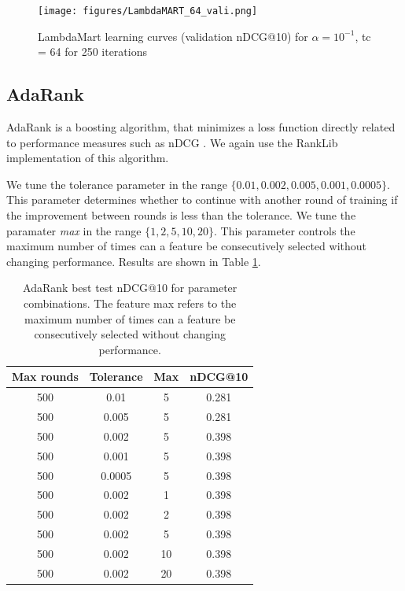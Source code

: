 \documentclass[english]{article}
\theoremstyle{definition}
\begin{document}
\begin{multicols}{2}
\begin{figure}[H]
\texttt{[image: figures/LambdaMART\_64\_vali.png]}
\caption{LambdaMart learning curves (validation nDCG@10) for $\alpha=10^{-1}$, tc = 64 for 250 iterations } \label{fig:LambdaMART_lc}
\label{LambdaMART_lc}
\end{figure}

\subsection{AdaRank}

AdaRank is a boosting algorithm, that minimizes a loss function directly related to performance measures such as nDCG \cite{Xu2007AdaRankAB}.  We again use the RankLib implementation of this algorithm.  

We tune the tolerance parameter in the range $\{0.01, 0.002, 0.005, 0.001, 0.0005\}$.  This parameter determines whether to continue with another round of training if the improvement between rounds is less than the tolerance.  We tune the paramater \emph{max} in the range $\{1, 2, 5, 10, 20\}$.  This parameter controls the maximum number of times can a feature be consecutively selected without changing performance.
Results are shown in Table \ref{tab:AdaRank_train}.

\begin{table}[H]
\begin{center}
\begin{tabular}{c c c c}
  \hline
  Max rounds & Tolerance & Max & nDCG@10\\
  \hline
  500 & 0.01 & 5 & 0.281 \\
  500 & 0.005 & 5 & 0.281 \\
  500 & 0.002 & 5 & 0.398 \\
  500 & 0.001 & 5 & 0.398 \\
  500 & 0.0005 & 5 & 0.398 \\
  \hline
  500 & 0.002 & 1 & 0.398 \\
  500 & 0.002 & 2 & 0.398 \\
  500 & 0.002 & 5 & 0.398 \\
  500 & 0.002 & 10 & 0.398 \\
  500 & 0.002 & 20 & 0.398 \\
  \hline
\end{tabular}
\caption{\label{tab:AdaRank_train}AdaRank best test nDCG@10 for parameter combinations.  The feature max refers to the maximum number of times can a feature be consecutively selected without changing performance.}
\end{center}
\end{table}


\end{multicols}
\end{document}
